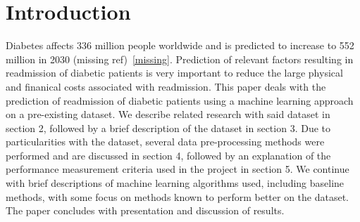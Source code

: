 \documentclass[conference]{IEEEtran}
\begin{document}
%

%

\section{Introduction}

Diabetes affects 336 million people worldwide and is predicted to increase to 552 million in 2030 (missing ref)~\ref{missing}. Prediction of relevant factors resulting in readmission of diabetic patients is very important to reduce the large physical and finanical costs associated with readmission. This paper deals with the prediction of readmission of diabetic patients using a machine learning approach on a pre-existing dataset. We describe related research with said dataset in section 2, followed by a brief description of the dataset in section 3. Due to particularities with the dataset, several data pre-processing methods were performed and are discussed in section 4, followed by an explanation of the performance measurement criteria used in the project in section 5. We continue with brief descriptions of machine learning algorithms used, including baseline methods, with some focus on methods known to perform better on the dataset. The paper concludes with presentation and discussion of results.
\end{document}
